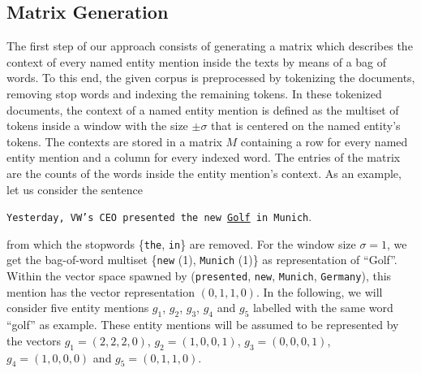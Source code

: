 \documentclass{llncs}
\begin{document}
\subsection{Matrix Generation}
The first step of our approach consists of generating a matrix which describes the context of every named entity mention inside the texts by means of a bag of words.
To this end, the given corpus is preprocessed by tokenizing the documents, removing stop words and indexing the remaining tokens.
In these tokenized documents, the context of a named entity mention is defined as the multiset of tokens inside a window with the size $\pm \sigma$ that is centered on the named entity's tokens.
The contexts are stored in a matrix $M$ containing a row for every named entity mention and a column for every indexed word.
The entries of the matrix are the counts of the words inside the entity mention's context.
As an example, let us consider the sentence 
\begin{example}
\texttt{Yesterday, VW's CEO presented the new \underline{Golf} in Munich}.
\end{example}
from which the stopwords \{\texttt{the}, \texttt{in}\} are removed.
For the window size $\sigma = 1$, we get the bag-of-word multiset \{\texttt{new} (1), \texttt{Munich} (1)\} as representation of ``Golf''.
Within the vector space spawned by (\texttt{presented}, \texttt{new}, \texttt{Munich}, \texttt{Germany}), this mention has the vector representation $(0, 1, 1, 0)$.
In the following, we will consider five entity mentions $g_1$, $g_2$, $g_3$, $g_4$ and $g_5$ labelled with the same word ``golf'' as example. 
These entity mentions will be assumed to be represented by the vectors 
$g_1 = (2,2,2,0)$, $g_2 = (1, 0, 0, 1)$, $g_3= (0,0,0,1)$, $g_4=(1, 0, 0, 0)$ and $g_5=(0, 1,1,0)$. 
\end{document}
